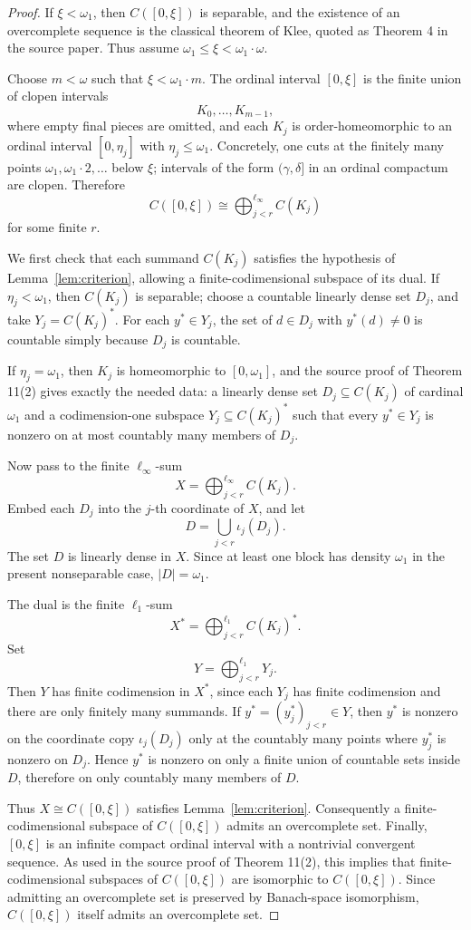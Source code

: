 \documentclass[11pt]{article}
\begin{document}
\begin{proof}
If \(\xi<\omega_1\), then \(C([0,\xi])\) is separable, and the existence of an
overcomplete sequence is the classical theorem of Klee, quoted as Theorem 4 in
the source paper. Thus assume \(\omega_1\leq \xi<\omega_1\cdot\omega\).

Choose \(m<\omega\) such that \(\xi<\omega_1\cdot m\). The ordinal interval
\([0,\xi]\) is the finite union of clopen intervals
\[
   K_0,\ldots,K_{m-1},
\]
where empty final pieces are omitted, and each \(K_j\) is order-homeomorphic
to an ordinal interval \([0,\eta_j]\) with \(\eta_j\leq\omega_1\). Concretely,
one cuts at the finitely many points \(\omega_1,\omega_1\cdot2,\ldots\) below
\(\xi\); intervals of the form \((\gamma,\delta]\) in an ordinal compactum are
clopen. Therefore
\[
   C([0,\xi]) \cong \bigoplus_{j<r}^{\ell_\infty} C(K_j)
\]
for some finite \(r\).

We first check that each summand \(C(K_j)\) satisfies the hypothesis of
Lemma~\ref{lem:criterion}, allowing a finite-codimensional subspace of its
dual. If \(\eta_j<\omega_1\), then \(C(K_j)\) is separable; choose a countable
linearly dense set \(D_j\), and take \(Y_j=C(K_j)^*\). For each \(y^*\in Y_j\),
the set of \(d\in D_j\) with \(y^*(d)\neq0\) is countable simply because
\(D_j\) is countable.

If \(\eta_j=\omega_1\), then \(K_j\) is homeomorphic to \([0,\omega_1]\), and
the source proof of Theorem 11(2) gives exactly the needed data: a linearly
dense set \(D_j\subseteq C(K_j)\) of cardinal \(\omega_1\) and a codimension-one
subspace \(Y_j\subseteq C(K_j)^*\) such that every \(y^*\in Y_j\) is nonzero on
at most countably many members of \(D_j\).

Now pass to the finite \(\ell_\infty\)-sum
\[
   X=\bigoplus_{j<r}^{\ell_\infty} C(K_j).
\]
Embed each \(D_j\) into the \(j\)-th coordinate of \(X\), and let
\[
   D=\bigcup_{j<r} \iota_j(D_j).
\]
The set \(D\) is linearly dense in \(X\). Since at least one block has density
\(\omega_1\) in the present nonseparable case, \(|D|=\omega_1\).

The dual is the finite \(\ell_1\)-sum
\[
   X^*=\bigoplus_{j<r}^{\ell_1} C(K_j)^*.
\]
Set
\[
   Y=\bigoplus_{j<r}^{\ell_1} Y_j.
\]
Then \(Y\) has finite codimension in \(X^*\), since each \(Y_j\) has finite
codimension and there are only finitely many summands. If
\(y^*=(y_j^*)_{j<r}\in Y\), then \(y^*\) is nonzero on the coordinate copy
\(\iota_j(D_j)\) only at the countably many points where \(y_j^*\) is nonzero
on \(D_j\). Hence \(y^*\) is nonzero on only a finite union of countable sets
inside \(D\), therefore on only countably many members of \(D\).

Thus \(X\cong C([0,\xi])\) satisfies Lemma~\ref{lem:criterion}. Consequently a
finite-codimensional subspace of \(C([0,\xi])\) admits an overcomplete set.
Finally, \([0,\xi]\) is an infinite compact ordinal interval with a nontrivial
convergent sequence. As used in the source proof of Theorem 11(2), this implies
that finite-codimensional subspaces of \(C([0,\xi])\) are isomorphic to
\(C([0,\xi])\). Since admitting an overcomplete set is preserved by Banach-space
isomorphism, \(C([0,\xi])\) itself admits an overcomplete set.
\end{proof}
\end{document}
